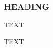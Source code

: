 \documentclass[gmd, preprint]{copernicus}
\begin{document}
\subsubsection{HEADING}
TEXT


\conclusions  %
TEXT












\appendix
\section{}    %

\subsection{}     %


\noappendix       %



\end{document}
